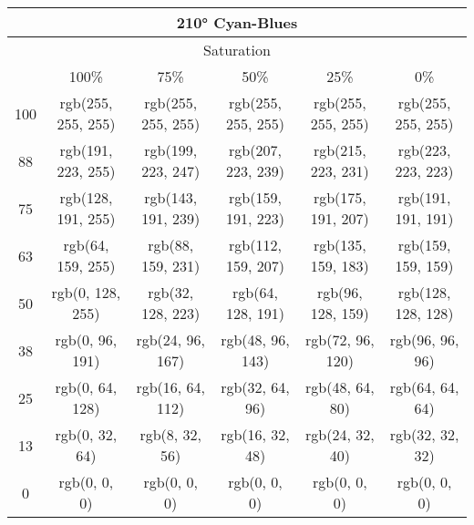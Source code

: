 \documentclass[a4j]{jarticle}
\begin{document}
\begin{tabular}{|c|c|c|c|c|c|}
\multicolumn{6}{|c|}{210°
 Cyan-Blues}\\\hline\multicolumn{6}{|c|}{Saturation}\\\hline&100\%&75\%&50\%&25\%&0\%\\\hline100&rgb(255,
     255, 255)&rgb(255, 255, 255)&rgb(255, 255, 255)&rgb(255, 255,
                 255)&rgb(255, 255, 255)\\\hline88&rgb(191, 223,
     255)&rgb(199, 223, 247)&rgb(207, 223, 239)&rgb(215, 223,
                 231)&rgb(223, 223, 223)\\\hline75&rgb(128, 191,
     255)&rgb(143, 191, 239)&rgb(159, 191, 223)&rgb(175, 191,
                 207)&rgb(191, 191, 191)\\\hline63&rgb(64, 159,
     255)&rgb(88, 159, 231)&rgb(112, 159, 207)&rgb(135, 159,
                 183)&rgb(159, 159, 159)\\\hline50&rgb(0, 128,
     255)&rgb(32, 128, 223)&rgb(64, 128, 191)&rgb(96, 128, 159)&rgb(128,
                     128, 128)\\\hline38&rgb(0, 96, 191)&rgb(24, 96,
         167)&rgb(48, 96, 143)&rgb(72, 96, 120)&rgb(96, 96,
                     96)\\\hline25&rgb(0, 64, 128)&rgb(16, 64,
         112)&rgb(32, 64, 96)&rgb(48, 64, 80)&rgb(64, 64,
                     64)\\\hline13&rgb(0, 32, 64)&rgb(8, 32, 56)&rgb(16,
             32, 48)&rgb(24, 32, 40)&rgb(32, 32, 32)\\\hline0&rgb(0, 0,
     0)&rgb(0, 0, 0)&rgb(0, 0, 0)&rgb(0, 0, 0)&rgb(0, 0, 0) 
\end{tabular}
\end{document}
